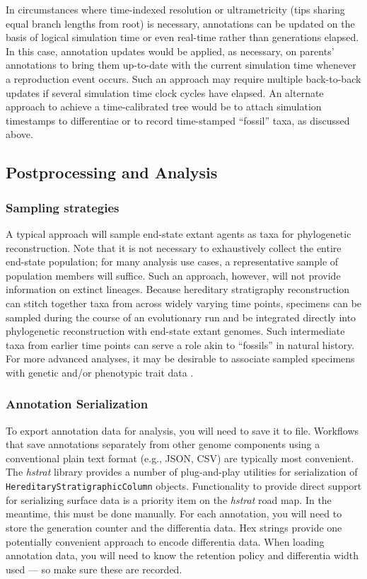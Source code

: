 In circumstances where time-indexed resolution or ultrametricity (tips sharing equal branch lengths from root) is necessary, annotations can be updated on the basis of logical simulation time or even real-time rather than generations elapsed.
In this case, annotation updates would be applied, as necessary, on parents' annotations to bring them up-to-date with the current simulation time whenever a reproduction event occurs.
Such an approach may require multiple back-to-back updates if several simulation time clock cycles have elapsed.
An alternate approach to achieve a time-calibrated tree would be to attach simulation timestamps to differentiae or to record time-stamped ``fossil'' taxa, as discussed above.

\subsection{Postprocessing and Analysis}

\subsubsection{Sampling strategies}

A typical approach will sample end-state extant agents as taxa for phylogenetic reconstruction.
Note that it is not necessary to exhaustively collect the entire end-state population; for many analysis use cases, a representative sample of population members will suffice.
Such an approach, however, will not provide information on extinct lineages.
Because hereditary stratigraphy reconstruction can stitch together taxa from across widely varying time points, specimens can be sampled during the course of an evolutionary run and be integrated directly into phylogenetic reconstruction with end-state extant genomes.
Such intermediate taxa from earlier time points can serve a role akin to ``fossils'' in natural history.
For more advanced analyses, it may be desirable to associate sampled specimens with genetic and/or phenotypic trait data \citep{dolson2019modes,khabbazian2016fast}.

\subsubsection{Annotation Serialization}

To export annotation data for analysis, you will need to save it to file.
Workflows that save annotations separately from other genome components using a conventional plain text format (e.g., JSON, CSV) are typically most convenient.
The \textit{hstrat} library provides a number of plug-and-play utilities for serialization of \texttt{HereditaryStratigraphicColumn} objects.
Functionality to provide direct support for serializing surface data is a priority item on the \textit{hstrat} road map.
In the meantime, this must be done manually.
For each annotation, you will need to store the generation counter and the differentia data.
Hex strings provide one potentially convenient approach to encode differentia data.
When loading annotation data, you will need to know the retention policy and differentia width used --- so make sure these are recorded.

